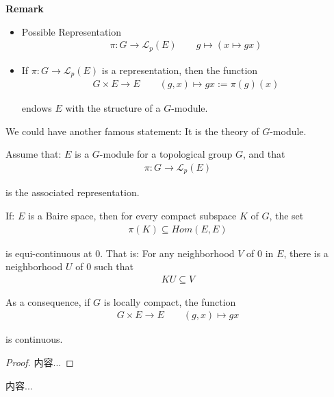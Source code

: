 \documentclass[Total.tex]{subfiles}
\begin{document}
			\textbf{Remark} \begin{itemize}
				\item  Possible Representation
				\begin{gather*}
					\pi:G\rightarrow \mathcal{L}_p(E)\qquad g\mapsto (x\mapsto gx)
				\end{gather*}
				\item If $\pi:G\rightarrow \mathcal{L}_p(E)$ is a representation, then the function
				\begin{gather*}
					G\times E\rightarrow E\qquad (g,x)\mapsto gx:=\pi(g)(x)
				\end{gather*}
				
				endows $E$ with the structure of a $G$-module.
			\end{itemize}
			
			We could have another famous statement:  It is the theory of $G$-module.
			\begin{theorem}
				Assume that: $E$ is a $G$-module for a topological group $G$, and that
				\begin{gather*}
					\pi:G\rightarrow \mathcal{L}_p(E)
				\end{gather*}
				
				is the associated representation. 
				
				If: $E$ is a Baire space, then for every compact subspace $K$ of $G$, the set
				\begin{gather*}
					\pi(K)\subseteq Hom(E,E)
				\end{gather*}
				
				is equi-continuous at $0$. That is: For any neighborhood $V$ of $0$ in $E$, there is a neighborhood $U$ of $0$ such that
				\begin{gather*}
					KU\subseteq V
				\end{gather*}
				
				As a consequence, if $G$ is locally compact, the function
				\begin{gather*}
					G\times E\rightarrow E\qquad (g,x)\mapsto gx
				\end{gather*}
				
				is continuous.
			\end{theorem}
			\begin{proof}
				内容...
			\end{proof}
			
			\begin{example}
				内容...
			\end{example}
			
\end{document}
